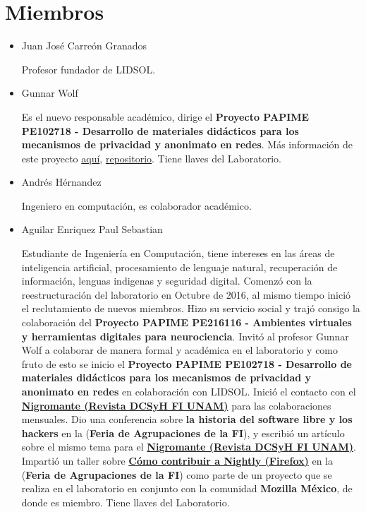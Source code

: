 \documentclass[a4paper,11pt]{article}                 %
\begin{document}
  \section{Miembros}
  \begin{itemize}
    \item Juan José Carreón Granados
    
    Profesor fundador de LIDSOL.
    
    \item Gunnar Wolf 
    
    Es el nuevo responsable académico, dirige el \textbf{Proyecto PAPIME PE102718 - Desarrollo de materiales didácticos para los mecanismos de privacidad y anonimato en redes}. Más información de este proyecto \href{https://www.priv-anon.unam.mx/}{aquí}, \href{https://github.com/LIDSOL/papime-pe102718-mecanismos-de-privacidad-y-anonimato}{repositorio}. Tiene llaves del Laboratorio.
    
    \item Andrés Hérnandez
    
    Ingeniero en computación, es colaborador académico.
    
    \item Aguilar Enriquez Paul Sebastian
    
    Estudiante de Ingeniería en Computación, tiene intereses en las áreas de inteligencia artificial, procesamiento de lenguaje natural, recuperación de información, lenguas indigenas y seguridad digital. Comenzó con la reestructuración del laboratorio en Octubre de 2016, al mismo tiempo inició el reclutamiento de nuevos miembros.  Hizo su servicio social y trajó consigo la colaboración del  \textbf{Proyecto PAPIME PE216116 - Ambientes virtuales y herramientas digitales para neurociencia}. Invitó al profesor Gunnar Wolf a colaborar de manera formal y académica en el laboratorio y como fruto de esto se inicio el \textbf{Proyecto PAPIME PE102718 - Desarrollo de materiales didácticos para los mecanismos de privacidad y anonimato en redes} en colaboración con LIDSOL. Inició el contacto con el \href{https://issuu.com/nigromantefi}{\textbf{Nigromante  (Revista DCSyH FI  UNAM)}} para las colaboraciones mensuales. Dio una conferencia sobre \textbf{la historia del software libre y los hackers} en la (\textbf{Feria de Agrupaciones de la FI}), y escribió un artículo sobre el mismo tema para el \href{https://issuu.com/nigromantefi}{\textbf{Nigromante  (Revista DCSyH FI  UNAM)}}. Impartió un taller sobre \href{https://github.com/LIDSOL/nightlynight}{\textbf{Cómo contribuir a Nightly (Firefox)}} en la (\textbf{Feria de Agrupaciones de la FI}) como parte de un proyecto que se realiza en el laboratorio en conjunto con la comunidad \textbf{Mozilla México}, de donde es miembro. Tiene llaves del Laboratorio.
    

\end{itemize}
\end{document}
